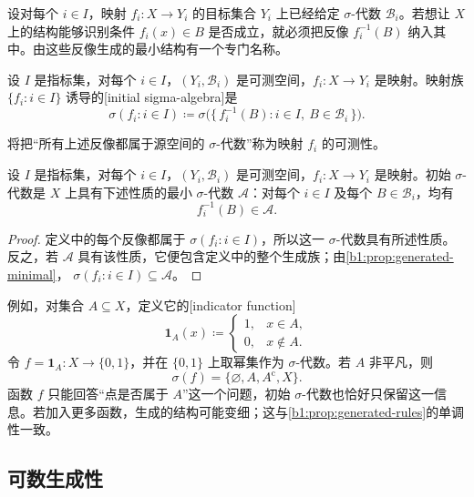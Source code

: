 设对每个 \(i\in I\)，映射 \(f_i:X\to Y_i\) 的目标集合 \(Y_i\) 上已经给定 \(\sigma\)-代数 \(\mathcal B_i\)。若想让 \(X\) 上的结构能够识别条件 \(f_i(x)\in B\) 是否成立，就必须把反像 \(f_i^{-1}(B)\) 纳入其中。由这些反像生成的最小结构有一个专门名称。

\begin{definition}
\label{b1:def:initial-sigma}
设 \(I\) 是指标集，对每个 \(i\in I\)，\((Y_i,\mathcal B_i)\) 是可测空间，\(f_i:X\to Y_i\) 是映射。映射族 \(\{f_i:i\in I\}\) 诱导的[initial sigma-algebra]是
\[
\sigma(f_i:i\in I)
\coloneqq\sigma\bigl(\{\,f_i^{-1}(B):i\in I,\ B\in\mathcal B_i\,\}\bigr).
\]
\end{definition}

将把“所有上述反像都属于源空间的 \(\sigma\)-代数”称为映射 \(f_i\) 的可测性。

\begin{proposition}
\label{b1:prop:initial-minimal}
设 \(I\) 是指标集，对每个 \(i\in I\)，\((Y_i,\mathcal B_i)\) 是可测空间，\(f_i:X\to Y_i\) 是映射。初始 \(\sigma\)-代数是 \(X\) 上具有下述性质的最小 \(\sigma\)-代数 \(\mathcal A\)：对每个 \(i\in I\) 及每个 \(B\in\mathcal B_i\)，均有
\[
f_i^{-1}(B)\in\mathcal A.
\]
\end{proposition}
\begin{proof}
定义中的每个反像都属于 \(\sigma(f_i:i\in I)\)，所以这一 \(\sigma\)-代数具有所述性质。反之，若 \(\mathcal A\) 具有该性质，它便包含定义中的整个生成族；由\cref{b1:prop:generated-minimal}，
\(
\sigma(f_i:i\in I)\subseteq\mathcal A
\)。
\end{proof}

例如，对集合 \(A\subseteq X\)，定义它的[indicator function]
\[
\mathbf 1_A(x)\coloneqq
\begin{cases}
1,&x\in A,\\
0,&x\notin A.
\end{cases}
\]
令 \(f=\mathbf 1_A:X\to\{0,1\}\)，并在 \(\{0,1\}\) 上取幂集作为 \(\sigma\)-代数。若 \(A\) 非平凡，则
\[
\sigma(f)=\{\varnothing,A,A^{\mathrm c},X\}.
\]
函数 \(f\) 只能回答“点是否属于 \(A\)”这一个问题，初始 \(\sigma\)-代数也恰好只保留这一信息。若加入更多函数，生成的结构可能变细；这与\cref{b1:prop:generated-rules}的单调性一致。

\subsection{可数生成性}
\label{b1:subsec:010203}


